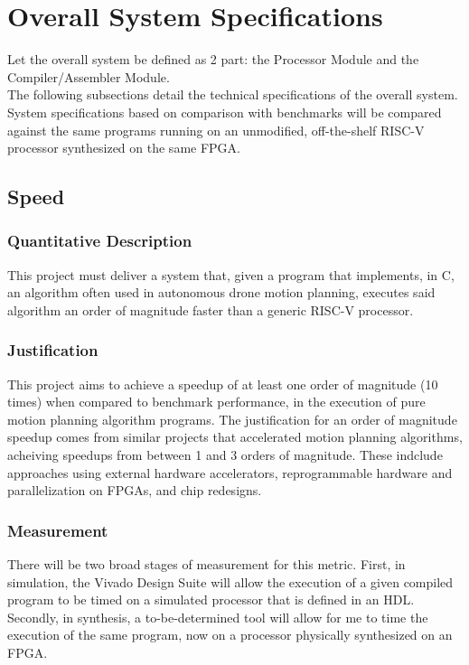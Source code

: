 

\section{Overall System Specifications}
Let the overall system be defined as 2 part: the Processor Module and the Compiler/Assembler Module. \\
The following subsections detail the technical specifications of the overall system. System specifications based on comparison with benchmarks will be compared against the same programs running on an unmodified, off-the-shelf RISC-V processor synthesized on the same \ac{FPGA}.
\subsection{Speed}
\subsubsection{Quantitative Description}
This project must deliver a system that, given a program that implements, in C, an algorithm often used in autonomous drone motion planning, executes said algorithm an order of magnitude faster than a generic RISC-V processor.

\subsubsection{Justification}
This project aims to achieve a speedup of at least one order of magnitude (10 times) when compared to benchmark performance, in the execution of pure motion planning algorithm programs.
The justification for an order of magnitude speedup comes from similar projects that accelerated motion planning algorithms, acheiving speedups from between 1 and 3 orders of magnitude. These indclude approaches using external hardware accelerators\cite{Murraya}, reprogrammable hardware and parallelization on FPGAs\cite{Murray}\cite{Atay2006}\cite{Malik2015}, and chip redesigns\cite{Murrayb}\cite{Zhi}.

\subsubsection{Measurement}
There will be two broad stages of measurement for this metric. First, in simulation, the Vivado Design Suite\cite{Vivado} will allow the execution of a given compiled program to be timed on a simulated processor that is defined in an \ac{HDL}. Secondly, in synthesis, a to-be-determined tool will allow for me to time the execution of the same program, now on a processor physically synthesized on an FPGA. 

